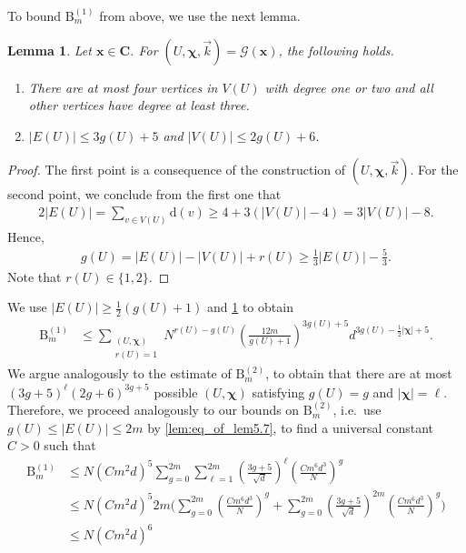 \documentclass[11pt]{article}
\newcommand{\abs}[1]{\left| #1 \right|}
\newcommand{\patx}{\boldsymbol{x}}
\newcommand{\patchi}{\boldsymbol{\chi}}
\theoremstyle{plain}
\newtheorem{lemma}{Lemma}[section]
\theoremstyle{remark}
\numberwithin{equation}{section}
\newcommand{\nc}{\normalcolor}
\begin{document}
To bound $\mathrm{B}^{(1)}_{m}$ from above, we use the next lemma. 
\begin{lemma}\label{lem:bound_case_ru<r}
    Let $\patx \in \boldsymbol C$. For $(U, \patchi, \vec{k})=\mathcal G(\patx)$, the following holds. 
    \begin{enumerate}
      \item  
      There are at most four vertices in $V(U)$  with degree one or two and all other vertices have degree at least three. 
      \nc 
        \item $|E(U)| \le 3g(U) + 5$ and $|V(U)| \le 2g(U) + 6$.
    \end{enumerate}
\end{lemma}

\begin{proof}
    The first point is a consequence of the construction of $(U, \patchi, \vec{k})$. 
    For the second point, we conclude from the first one that 
    \begin{align*}
        2|E(U)| = \sum_{v \in V(U)} \mathrm{d}(v) 
        \ge 4 + 3(|V(U)| - 4) = 3 |V(U)| - 8. 
    \end{align*}
    Hence, 
    \begin{align*}
        g(U) = |E(U)|- |V(U)| + r(U) \ge \frac{1}{3} |E(U)| - \frac{5}{3}.
    \end{align*}
    Note that $r(U) \in \{1 ,2 \}$. 
\end{proof}
We use $|E(U)| \ge \frac{1}{2}(g(U)+1)$  and \cref{lem:bound_case_ru<r} to obtain 
\begin{align*}
    \mathrm{B}_{m}^{(1)} &\le \sum_{\substack{(U,\patchi)\\ r(U)=1}} N^{r(U)-g(U)} \left(\frac{12m}{g(U)+1}\right)^{3g(U)+5}d^{3g(U) - \frac{1}{2}|\patchi| + 5}.
\end{align*}
 We argue analogously to the estimate of $\mathrm{B}_{m}^{(2)}$, to obtain that there are at most $(3g+ 5)^\ell (2g + 6)^{3g+5}$ possible $(U,\patchi)$ satisfying $g(U)=g$ and $|\patchi|=\ell$. Therefore, we proceed analogously to our bounds on $\mathrm{B}_m^{(2)}$, i.e.\ use  $g(U) \leq \abs{E(U)} \leq 2m$ by \cref{lem:eq_of_lem5.7},
to find a universal constant $C>0$ such that 
\begin{align*}
        \mathrm{B}_{m}^{(1)} &\le N (Cm^2d)^{5}\sum_{g=0}^{2m} \sum_{\ell=1}^{2m}\left(\frac{3g+5}{\sqrt{d}}\right)^\ell \left(\frac{C m^6d^3}{N}\right)^g\\
        &\le  N(Cm^2d)^{5} 2m \biggl(  \sum_{g=0}^{2m}  \left(\frac{Cm^6d^3}{N}\right)^g + \sum_{g=0}^{2m}\left(\frac{3g + 5}{\sqrt{d}}\right)^{2m} \left(\frac{C m^6d^3}{N}\right)^g \biggr)\\
        &\le N (Cm^2d)^{6} 
\end{align*}
\end{document}
